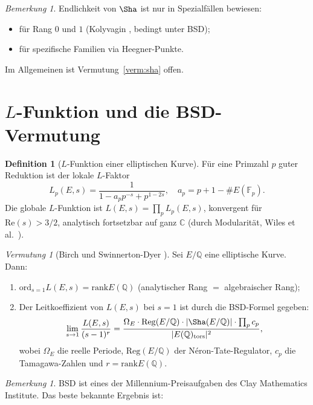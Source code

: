 \documentclass[12pt,a4paper]{amsart}
\theoremstyle{definition}
\newtheorem{definition_de}[theorem]{Definition}
\theoremstyle{remark}
\newtheorem{bemerkung}[theorem]{Bemerkung}
\newtheorem{vermutung}[theorem]{Vermutung}
\newcommand{\Q}{\mathbb{Q}}
\newcommand{\C}{\mathbb{C}}
\newcommand{\F}{\mathbb{F}}
\newcommand{\rank}{\mathrm{rank}}
\newcommand{\ord}{\mathrm{ord}}
\begin{document}
\begin{bemerkung}
  Endlichkeit von $\Sha$ ist nur in Spezialfällen bewiesen:
  \begin{itemize}
    \item für Rang $0$ und $1$ (Kolyvagin \cite{Kolyvagin1988}, bedingt unter BSD);
    \item für spezifische Familien via Heegner-Punkte.
  \end{itemize}
  Im Allgemeinen ist Vermutung~\ref{verm:sha} offen.
\end{bemerkung}

\section{$L$-Funktion und die BSD-Vermutung}\label{sec:bsd}

\begin{definition_de}[$L$-Funktion einer elliptischen Kurve]
  Für eine Primzahl $p$ guter Reduktion ist der lokale $L$-Faktor
  \[
    L_p(E,s) = \frac{1}{1 - a_p p^{-s} + p^{1-2s}}, \quad
    a_p = p + 1 - \#E(\F_p).
  \]
  Die globale $L$-Funktion ist $L(E,s) = \prod_p L_p(E,s)$,
  konvergent für $\mathrm{Re}(s) > 3/2$, analytisch fortsetzbar auf ganz $\C$
  (durch Modularität, Wiles et al.\ \cite{BCDT2001}).
\end{definition_de}

\begin{vermutung}[Birch und Swinnerton-Dyer \cite{BSD1965}]\label{verm:bsd}
  Sei $E/\Q$ eine elliptische Kurve. Dann:
  \begin{enumerate}[label=(\roman*)]
    \item $\ord_{s=1} L(E,s) = \rank E(\Q)$ \quad (analytischer Rang $=$ algebraischer Rang);
    \item Der Leitkoeffizient von $L(E,s)$ bei $s=1$ ist durch die BSD-Formel gegeben:
    \[
      \lim_{s\to 1} \frac{L(E,s)}{(s-1)^r} =
      \frac{\Omega_E \cdot \mathrm{Reg}(E/\Q) \cdot |\Sha(E/\Q)| \cdot \prod_p c_p}
           {|E(\Q)_{\mathrm{tors}}|^2},
    \]
    wobei $\Omega_E$ die reelle Periode, $\mathrm{Reg}(E/\Q)$ der Néron-Tate-Regulator,
    $c_p$ die Tamagawa-Zahlen und $r = \rank E(\Q)$.
  \end{enumerate}
\end{vermutung}

\begin{bemerkung}
  BSD ist eines der Millennium-Preisaufgaben des Clay Mathematics Institute.
  Das beste bekannte Ergebnis ist:
\end{bemerkung}
\end{document}
